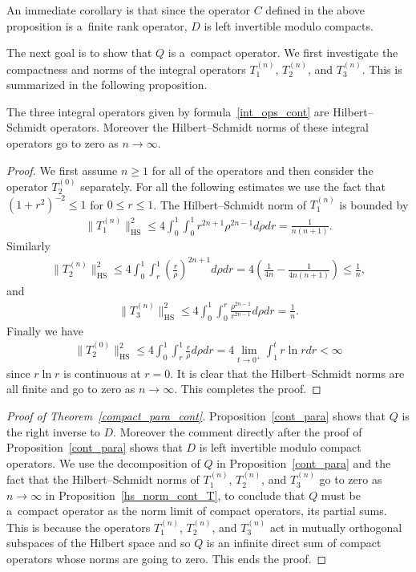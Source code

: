 An immediate corollary is that since the operator $C$ def\/ined in the above proposition is a~f\/inite rank operator, $D$ is
left invertible modulo compacts.

The next goal is to show that $Q$ is a~compact operator.
We f\/irst investigate the compactness and norms of the integral operators $T_1^{(n)}$, $T_2^{(n)}$, and $T_3^{(n)}$.
This is summarized in the following proposition.

\begin{prop}
\label{hs_norm_cont_T}
The three integral operators given by formula~\eqref{int_ops_cont} are Hilbert--Schmidt ope\-rators.
Moreover the Hilbert--Schmidt norms of these integral operators go to zero as $n\to\infty$.
\end{prop}

\begin{proof}
We f\/irst assume $n\ge1$ for all of the operators and then consider the operator $T_2^{(0)}$ separately.
For all the following estimates we use the fact that $(1+r^2)^{-2} \le 1$ for $0\le r\le 1$.
The Hilbert--Schmidt norm of $T_1^{(n)}$ is bounded by
\begin{gather*}
\|T_1^{(n)}\|_{\textrm{HS}}^2 \le 4\int_0^1\int_0^1r^{2n+1}\rho^{2n-1}d\rho dr =\frac{1}{n(n+1)}.
\end{gather*}
Similarly
\begin{gather*}
\|T_2^{(n)}\|_{\textrm{HS}}^2 \le 4\int_0^1\int_r^1 \left(\frac{r}{\rho}\right)^{2n+1}d\rho dr=4\left(\frac{1}{4n}-
\frac{1}{4n(n+1)}\right) \le \frac{1}{n},
\end{gather*}
and
\begin{gather*}
\|T_3^{(n)}\|_{\textrm{HS}}^2 \le 4\int_0^1\int_0^r \frac{\rho^{2n-1}}{r^{2n-1}}d\rho dr = \frac{1}{n}.
\end{gather*}
Finally we have
\begin{gather*}
\big\|T_2^{(0)}\big\|_{\textrm{HS}}^2 \le 4 \int_0^1 \int_r^1 \frac{r}{\rho}d\rho dr = 4\lim_{t\to0^+}\int_1^t r\ln r dr
<\infty
\end{gather*}
since $r\ln r$ is continuous at $r=0$.
It is clear that the Hilbert--Schmidt norms are all f\/inite and go to zero as $n\to\infty$.
This completes the proof.
\end{proof}

\begin{proof}[Proof of Theorem~\ref{compact_para_cont}] Proposition~\ref{cont_para} shows that $Q$ is the right inverse to $D$.
Moreover the comment directly after the proof of Proposition~\ref{cont_para} shows that $D$ is left invertible modulo
compact operators.
We use the decomposition of $Q$ in Proposition~\ref{cont_para} and the fact that the Hilbert--Schmidt norms of
$T_1^{(n)}$, $T_2^{(n)}$, and $T_3^{(n)}$ go to zero as $n\to\infty$ in Proposition~\ref{hs_norm_cont_T}, to conclude
that $Q$ must be a~compact operator as the norm limit of compact operators, its partial sums.
This is because the operators $T_1^{(n)}$, $T_2^{(n)}$, and $T_3^{(n)}$ act in mutually orthogonal subspaces of the
Hilbert space and so $Q$ is an inf\/inite direct sum of compact operators whose norms are going to zero.
This ends the proof.
\end{proof}

